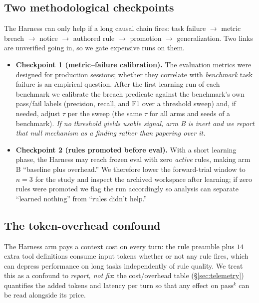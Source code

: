 \documentclass[letterpaper]{article} %
\newcommand{\passk}{\mathrm{pass}^{k}}
\begin{document}
\subsection{Two methodological checkpoints}
\label{sec:checkpoints}
The Harness can only help if a long causal chain fires: task failure $\to$ metric breach $\to$
notice $\to$ authored rule $\to$ promotion $\to$ generalization. Two links are unverified going
in, so we gate expensive runs on them.
\begin{itemize}\itemsep2pt
\item \textbf{Checkpoint 1 (metric--failure calibration).} The evaluation metrics were designed
for production sessions; whether they correlate with \emph{benchmark} task failure is an
empirical question. After the first learning run of each benchmark we calibrate the breach
predicate against the benchmark's own pass/fail labels (precision, recall, and F1 over a
threshold sweep) and, if needed, adjust $\tau$ per the sweep (the same $\tau$ for all arms and
seeds of a benchmark). \emph{If no threshold yields usable signal, arm B is inert and we report
that null mechanism as a finding rather than papering over it.}
\item \textbf{Checkpoint 2 (rules promoted before eval).} With a short learning phase, the
Harness may reach frozen eval with zero \emph{active} rules, making arm B ``baseline plus
overhead.'' We therefore lower the forward-trial window to $n=3$ for the study and inspect the
archived workspace after learning; if zero rules were promoted we flag the run accordingly so
analysis can separate ``learned nothing'' from ``rules didn't help.''
\end{itemize}

\subsection{The token-overhead confound}
\label{sec:confound}
The Harness arm pays a context cost on every turn: the rule preamble plus $14$ extra tool
definitions consume input tokens whether or not any rule fires, which can depress performance
on long tasks independently of rule quality. We treat this as a confound to \emph{report, not
fix}: the cost/overhead table (\S\ref{sec:telemetry}) quantifies the added tokens and latency
per turn so that any effect on $\passk$ can be read alongside its price.
\end{document}
